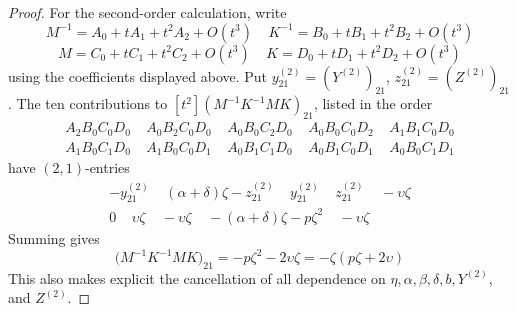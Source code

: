 \documentclass{article}
\theoremstyle{plain}
\theoremstyle{definition}
\theoremstyle{plain}
\theoremstyle{plain}
\theoremstyle{plain}
\theoremstyle{remark}
\theoremstyle{remark}
\theoremstyle{plain}
\theoremstyle{plain}
\theoremstyle{plain}
\theoremstyle{plain}
\begin{document}
\begin{proof}
For the second-order calculation, write
\begin{equation*}
	M^{-1}=A_0+tA_1+t^2A_2+O(t^3) \ \ \ \ \
	K^{-1}=B_0+tB_1+t^2B_2+O(t^3)
\end{equation*}
\begin{equation*}
	M=C_0+tC_1+t^2C_2+O(t^3) \ \ \ \ \
	K=D_0+tD_1+t^2D_2+O(t^3)
\end{equation*}
using the coefficients displayed above.  Put $y_{21}^{(2)}=(Y^{(2)})_{21}$, $z_{21}^{(2)}=(Z^{(2)})_{21}$. The ten contributions to $[t^2](M^{-1}K^{-1}MK)_{21}$, listed in the order
\begin{equation*}
	\begin{gathered}
		A_2B_0C_0D_0 \ \ \ \ \
		A_0B_2C_0D_0 \ \ \ \ \
		A_0B_0C_2D_0 \ \ \ \ \ 
		A_0B_0C_0D_2 \ \ \ \ \ 
		A_1B_1C_0D_0 \\
		A_1B_0C_1D_0 \ \ \ \ \ 
		A_1B_0C_0D_1 \ \ \ \ \
		A_0B_1C_1D_0 \ \ \ \ \
		A_0B_1C_0D_1 \ \ \ \ \
		A_0B_0C_1D_1
	\end{gathered}
\end{equation*}
have $(2,1)$-entries
\begin{equation*}
	\begin{gathered}
		-y_{21}^{(2)} \ \ \ \ \
		(\alpha+\delta)\zeta-z_{21}^{(2)} \ \ \ \ \
		y_{21}^{(2)} \ \ \ \ \
		z_{21}^{(2)} \ \ \ \ \
		-\upsilon\zeta \\
		0 \ \ \ \ \
		\upsilon\zeta \ \ \ \ \
		-\upsilon\zeta \ \ \ \ \
		-(\alpha+\delta)\zeta-p\zeta^2 \ \ \ \ \
		-\upsilon\zeta
	\end{gathered}
\end{equation*}
Summing gives
\begin{equation*}
	[t^2]\bigl(M^{-1}K^{-1}MK\bigr)_{21} = -p\zeta^2-2\upsilon\zeta = -\zeta(p\zeta+2\upsilon)
\end{equation*}
This also makes explicit the cancellation of all dependence on $\eta,\alpha,\beta,\delta,b,Y^{(2)}$, and $Z^{(2)}$.
\end{proof}



\end{document}
